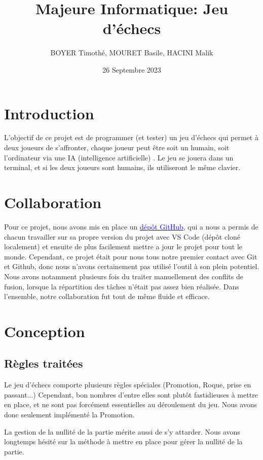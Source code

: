 \documentclass{article}
\title{\centering Majeure Informatique: 
Jeu d'échecs}
\author{BOYER Timothé, MOURET Basile, HACINI Malik}
\date{26 Septembre 2023}
\begin{document}
    
    

\maketitle
\tableofcontents{}

\section{Introduction}
L’objectif de ce projet est de programmer (et tester) un jeu
d’échecs qui permet à deux joueurs de s’affronter, 
chaque joueur peut être soit un humain, soit l’ordinateur via une IA
 (intelligence artificielle) . Le jeu se jouera dans un terminal, 
 et si les deux joueurs sont humains, ils utiliseront le même clavier.
\section{Collaboration}
 
Pour ce projet, nous avons mis en place un \href{https://github.com/Zertag/Projet-POO}{\textcolor{blue}{dépôt GitHub}}, qui a nous a permis
de chacun travailler sur sa propre version du projet avec VS Code (dépôt cloné localement) et 
ensuite de plus facilement mettre a jour le projet pour tout le monde.
Cependant, ce projet était pour nous tous notre premier contact avec Git et Github, donc
nous n'avons certainement pas utilisé l'outil à son plein potentiel. Nous avons notamment
plusieurs fois du traiter manuellement des conflits de fusion, lorsque la répartition
des tâches n'était pas assez bien réalisée.
Dans l'ensemble, notre collaboration fut tout de même fluide et efficace.
\section{Conception}
\subsection{Règles traitées}
Le jeu d'échecs comporte plusieurs règles spéciales (Promotion, Roque, prise en passant...)
Cependant, bon nombres d'entre elles sont plutôt fastidieuses à mettre en place,
et ne sont pas forcément essentielles au déroulement du jeu.
Nous avons donc seulement implémenté la Promotion.

La gestion de la nullité de la partie mérite aussi de s'y attarder.
Nous avons longtemps hésité sur la méthode à mettre en place pour gérer la nullité de la partie.
\end{document}
